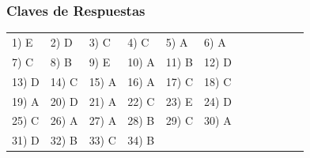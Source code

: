 \subsubsection*{Claves de Respuestas}


\begin{center}
	\begin{tabular}{ll ll ll ll ll ll}
		1) E & 2) D & 3) C & 4) C & 5) A & 6) A \\
		7) C & 8) B & 9) E & 10) A & 11) B & 12) D \\
		13) D & 14) C & 15) A & 16) A & 17) C & 18) C \\
		19) A & 20) D & 21) A & 22) C & 23) E & 24) D \\
		25) C & 26) A & 27) A & 28) B & 29) C & 30) A \\
		31) D & 32) B & 33) C & 34) B & & \\
	\end{tabular}
\end{center}

